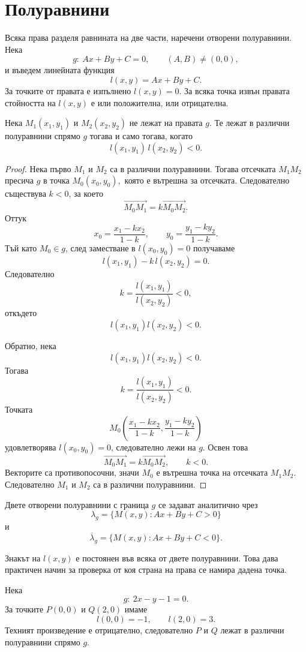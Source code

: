 \section{Полуравнини}\label{s:28.6}

Всяка права разделя равнината на две части, наречени отворени
полуравнини. Нека
\[
 g:\ Ax+By+C=0,\qquad (A,B)\neq(0,0),
\]
и въведем линейната функция
\[
 l(x,y)=Ax+By+C.
\]
За точките от правата е изпълнено $l(x,y)=0$. За всяка точка извън
правата стойността на $l(x,y)$ е или положителна, или отрицателна.

\begin{keythm}
Нека $M_1(x_1,y_1)$ и $M_2(x_2,y_2)$ не лежат на правата $g$. Те лежат
в различни полуравнини спрямо $g$ тогава и само тогава, когато
\[
 l(x_1,y_1)\,l(x_2,y_2)<0.
\]
\end{keythm}

\begin{proof}
Нека първо $M_1$ и $M_2$ са в различни полуравнини. Тогава отсечката
$M_1M_2$ пресича $g$ в точка $M_0(x_0,y_0),$ която е вътрешна за
отсечката. Следователно съществува $k<0$, за което
\[
 \overrightarrow{M_0M_1}=k\overrightarrow{M_0M_2}.
\]
Оттук
\[
 x_0=\frac{x_1-kx_2}{1-k},\qquad
 y_0=\frac{y_1-ky_2}{1-k}.
\]
Тъй като $M_0\in g$, след заместване в $l(x_0,y_0)=0$ получаваме
\[
 l(x_1,y_1)-k\,l(x_2,y_2)=0.
\]
Следователно
\[
 k=\frac{l(x_1,y_1)}{l(x_2,y_2)}<0,
\]
откъдето
\[
 l(x_1,y_1)l(x_2,y_2)<0.
\]

Обратно, нека
\[
 l(x_1,y_1)l(x_2,y_2)<0.
\]
Тогава
\[
 k=\frac{l(x_1,y_1)}{l(x_2,y_2)}<0.
\]
Точката
\[
 M_0\left(
 \frac{x_1-kx_2}{1-k},
 \frac{y_1-ky_2}{1-k}
 \right)
\]
удовлетворява $l(x_0,y_0)=0$, следователно лежи на $g$. Освен това
\[
 \overrightarrow{M_0M_1}
 =k\overrightarrow{M_0M_2},\qquad k<0.
\]
Векторите са противопосочни, значи $M_0$ е вътрешна точка на
отсечката $M_1M_2$. Следователно $M_1$ и $M_2$ са в различни
полуравнини.
\end{proof}

\begin{defn}
Двете отворени полуравнини с граница $g$ се задават аналитично чрез
\[
 \lambda_g=\{M(x,y):Ax+By+C>0\}
\]
и
\[
 \overline{\lambda}_g=\{M(x,y):Ax+By+C<0\}.
\]
\end{defn}

Знакът на $l(x,y)$ е постоянен във всяка от двете полуравнини. Това
дава практичен начин за проверка от коя страна на права се намира
дадена точка.

\begin{example}
Нека
\[
 g:\ 2x-y-1=0.
\]
За точките $P(0,0)$ и $Q(2,0)$ имаме
\[
 l(0,0)=-1,\qquad l(2,0)=3.
\]
Техният произведение е отрицателно, следователно $P$ и $Q$ лежат в
различни полуравнини спрямо $g$.
\end{example}

